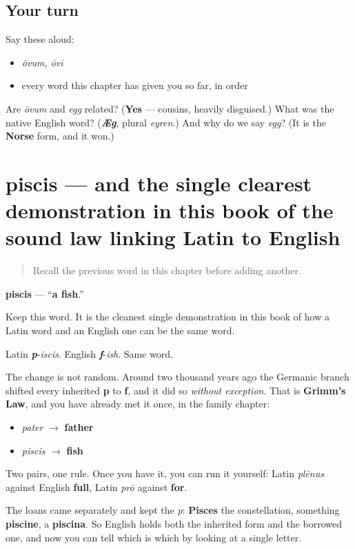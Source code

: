\subsection*{Your turn}
Say these aloud:

\begin{itemize}
\raggedright
  \item \emph{ōvum, ōvī}
  \item every word this chapter has given you so far, in order
\end{itemize}

\begin{tcolorbox}[breakable,colback=teal!4,colframe=teal!35!black,title={Before you move on}]
Are \emph{ōvum} and \emph{egg} related? (\textbf{Yes} — cousins, heavily disguised.) What was the native English word? (\emph{\textbf{Æg}}, plural \emph{eyren}.) And why do we say \emph{egg}? (It is the \textbf{Norse} form, and it won.)
\end{tcolorbox}
\section[piscis, piscis]{piscis — and the single clearest demonstration in this book of the sound law linking Latin to English}

\label{lesson:LA-C47-piscis}



\begin{quote}
Recall the previous word in this chapter before adding another.
\end{quote}

\begin{cousinweb}
\textbf{piscis} — \textquotedblleft{}\textbf{a fish}.\textquotedblright{}

Keep this word. It is the cleanest single demonstration in this book of how a Latin word and an English one can be the same word.

Latin \emph{\textbf{p}}-\emph{iscis}. English \emph{\textbf{f}}-\emph{ish}. Same word.

The change is not random. Around two thousand years ago the Germanic branch shifted every inherited \textbf{p} to \textbf{f}, and it did so \emph{without exception}. That is \textbf{Grimm's Law}, and you have already met it once, in the family chapter:

\begin{itemize}
\raggedright
  \item \emph{pater} $\to$ \textbf{father}
  \item \emph{piscis} $\to$ \textbf{fish}
\end{itemize}

Two pairs, one rule. Once you have it, you can run it yourself: Latin \emph{plēnus} against English \textbf{full}, Latin \emph{prō} against \textbf{for}.

The loans came separately and kept the \emph{p}: \textbf{Pisces} the constellation, something \textbf{piscine}, a \textbf{piscina}. So English holds both the inherited form and the borrowed one, and now you can tell which is which by looking at a single letter.
\end{cousinweb}

